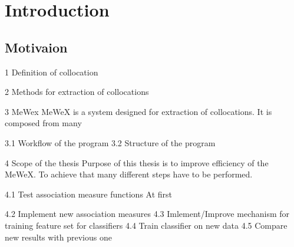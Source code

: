 
\chapter{Introduction}
\section{Motivaion}
1 Definition of collocation




2 Methods for extraction of collocations


3 MeWex
MeWeX is a system designed for extraction of collocations. It is composed from many


3.1 Workflow of the program
3.2 Structure of the program


4 Scope of the thesis
Purpose of this thesis is to improve efficiency of the MeWeX. To achieve that many different steps have to be performed.


4.1 Test association measure functions
At first 

4.2 Implement new association measures
4.3 Imlement/Improve mechanism for training feature set for classifiers
4.4 Train classifier on new data
4.5 Compare new results with previous one

